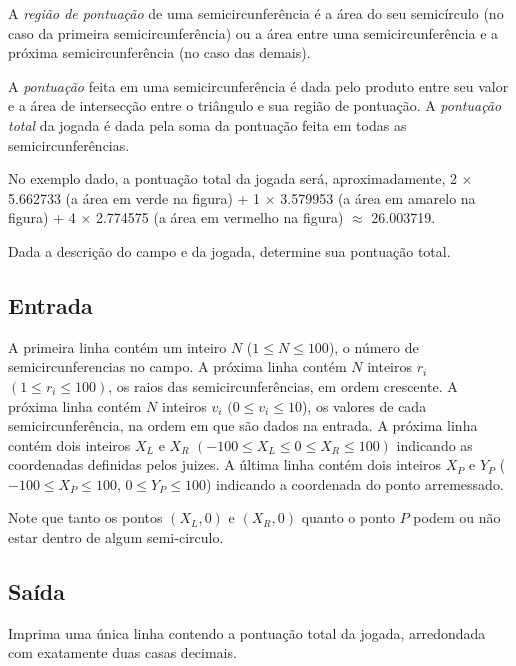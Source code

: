 A \textit{região de pontuação} de uma semicircunferência é a área do seu
semicírculo (no caso da primeira semicircunferência) ou a área entre uma
semicircunferência e a próxima semicircunferência (no caso das demais).

A \textit{pontuação} feita em uma semicircunferência é dada pelo produto entre
seu valor e a área de intersecção entre o triângulo e sua região de pontuação.
A \textit{pontuação total} da jogada é dada pela soma da pontuação feita em
todas as semicircunferências.

No exemplo dado, a pontuação total da jogada será, aproximadamente,
2 $\times$ 5.662733 (a área em verde na figura)
+ 1 $\times$ 3.579953 (a área em amarelo na figura)
+ 4 $\times$ 2.774575 (a área em vermelho na figura)
$\approx$ 26.003719.

Dada a descrição do campo e da jogada, determine sua pontuação total.

\subsection*{Entrada}

A primeira linha contém um inteiro $N$ ($1 \leq N \leq 100$), o número de
semicircunferencias no campo. A próxima linha contém $N$ inteiros $r_i$
$(1 \leq r_i \leq 100)$, os raios das semicircunferências, em ordem crescente.
A próxima linha contém $N$ inteiros $v_i$
$(0 \leq v_i \leq 10$), os valores de cada semicircunferência, na ordem em que são
dados na entrada.
A próxima linha contém dois inteiros $X_L$ e $X_R$
$(-100 \leq X_L \leq 0 \leq X_R \leq 100)$ indicando as coordenadas definidas pelos juizes. A última linha contém dois inteiros
$X_P$ e $Y_P$ ($-100 \leq X_P \leq 100$, $0 \leq Y_P \leq 100$) indicando a
coordenada do ponto arremessado.

Note que tanto os pontos $(X_L,0)$ e $(X_R,0)$ quanto o ponto
$P$ podem ou não estar dentro de algum semi-circulo.

\subsection*{Saída}

Imprima uma única linha contendo a pontuação total da jogada, arredondada com
exatamente duas casas decimais.

